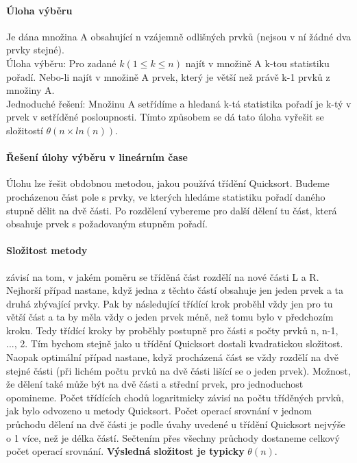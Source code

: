\documentclass[10pt,a4paper]{article}
\begin{document}
\paragraph{Úloha výběru}
Je dána množina A obsahující n vzájemně odlišných prvků (nejsou v ní žádné dva prvky stejné). \\
Úloha výběru: Pro zadané $k (1 \leq k \leq n)$ najít v množině A k-tou statistiku pořadí. Nebo-li najít v množině A prvek, který je větší než právě k-1 prvků z množiny A. \\
Jednoduché řešení: Množinu A setřídíme a hledaná k-tá statistika pořadí je k-tý v prvek v setříděné posloupnosti. Tímto způsobem se dá tato úloha vyřešit se složitostí $\theta (n \times ln(n))$.
\paragraph{Řešení úlohy výběru v lineárním čase} Úlohu lze řešit obdobnou metodou, jakou používá třídění Quicksort. Budeme procházenou část pole s prvky, ve kterých hledáme statistiku pořadí daného stupně dělit na dvě části. Po rozdělení vybereme pro další dělení tu část, která obsahuje prvek s požadovaným stupněm pořadí.
\paragraph{Složitost metody} závisí na tom, v jakém poměru se tříděná část rozdělí na nové části L a R. Nejhorší případ nastane, když jedna z těchto částí obsahuje jen jeden prvek a ta druhá zbývající prvky. Pak by následující třídící krok proběhl vždy jen pro tu větší část a ta by měla vždy o jeden prvek méně, než tomu bylo v předchozím kroku. Tedy třídící kroky by proběhly postupně pro části s počty prvků n, n-1, ..., 2. Tím bychom stejně jako u třídění Quicksort dostali kvadratickou složitost. \\
Naopak optimální případ nastane, když procházená část se vždy rozdělí na dvě stejné části (při lichém počtu prvků na dvě části lišící se o jeden prvek). Možnost, že dělení také může být na dvě části a střední prvek, pro jednoduchost opomineme. Počet třídících chodů logaritmicky závisí na počtu tříděných prvků, jak bylo odvozeno u metody Quicksort. Počet operací srovnání v jednom průchodu dělení na dvě části je podle úvahy uvedené u třídění Quicksort nejvýše o 1 více, než je délka částí. Sečtením přes všechny průchody dostaneme celkový počet operací srovnání. \textbf{Výsledná složitost je typicky} $\theta (n)$.
\end{document}
